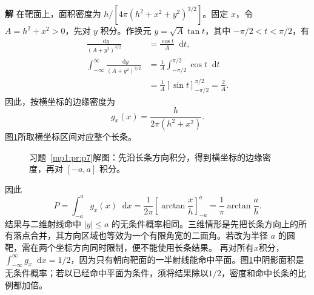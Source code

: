 \documentclass[11pt,openany,fontset=fandol]{ctexbook}
\theoremstyle{definition}\newtheorem{example}{例}[chapter]\newtheorem{exercise}{习题}[chapter]
\newcommand{\SolutionStart}{\par\medskip\ifdim\pagetotal>0pt\ifdim\dimexpr\pagegoal-\pagetotal\relax<3\baselineskip\newpage\fi\fi\noindent\textbf{解}\quad\ignorespaces}
\newenvironment{solution}{\SolutionStart}{\par\medskip}
\newcommand{\dd}{\mathop{}\!\mathrm d}\newcommand{\ee}{\mathrm e}\newcommand{\vct}[1]{\bm{#1}}
\begin{document}
\begin{solution}
在靶面上，面积密度为 $h/[4\pi(h^2+x^2+y^2)^{3/2}]$。固定 $x$，令 $A=h^2+x^2>0$，先对 $y$ 积分。作换元 $y=\sqrt A\tan t$，其中 $-\pi/2<t<\pi/2$，有
\begin{align*}
\frac{\dd y}{(A+y^2)^{3/2}}&=\frac{\cos t}{A}\dd t,\\
\int_{-\infty}^{\infty}\frac{\dd y}{(A+y^2)^{3/2}}
&=\frac1A\int_{-\pi/2}^{\pi/2}\cos t\dd t\\
&=\frac1A[\sin t]_{-\pi/2}^{\pi/2}=\frac2A.
\end{align*}
因此，按横坐标的边缘密度为
\[
g_x(x)=\frac h{2\pi(h^2+x^2)}.
\]
图\ref{mp1:fig:p7-s}所取横坐标区间对应整个长条。

\begin{figure}[H]\centering

\caption{习题~\ref{mp1:pr:p7}解图：先沿长条方向积分，得到横坐标的边缘密度，再对 $[-a,a]$ 积分。}\label{mp1:fig:p7-s}
\end{figure}

因此
\[
P=\int_{-a}^a g_x(x)\dd x
=\frac1{2\pi}\left[\arctan\frac xh\right]_{-a}^a
=\frac1\pi\arctan\frac ah.
\]
结果与二维射线命中 $|y|\le a$ 的无条件概率相同。三维情形是先把长条方向上的所有落点合并，其方向区域也等效为一个有限角宽的二面角。若改为半径 $a$ 的圆靶，需在两个坐标方向同时限制，便不能使用长条结果。
再对所有$x$积分，$\int_{-\infty}^{\infty}g_x\dd x=1/2$，因为只有朝向靶面的一半射线能命中平面。图\ref{mp1:fig:p7-s}中阴影面积是无条件概率；若以已经命中平面为条件，须将结果除以$1/2$，密度和命中长条的比例都加倍。
\end{solution}
\end{document}
